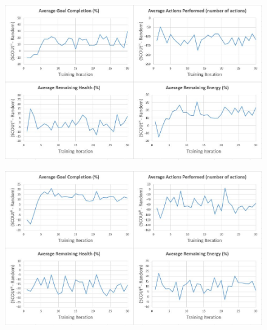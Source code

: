 \begin{appxfig}[H]
\begin{figure}[H]
  \centering
  \includegraphics[width=1.0\columnwidth]{Figures/Results/TrainingVariation2/FindHuman.JPG}
\end{figure}
\caption{Iteration testing performance results for $SCOUt_{FH}$ attempting \textit{Find Human} using setup variation 2 (see subsection~\ref{subsec:training_variations}). All graphs show the controller's average difference in performance compared to $Random$ ($SCOUt_{FH}$ average - $Random$ average) VS the number of training iterations completed.}
\label{appendix:findhuman_training_variation2}
\end{appxfig}


\begin{appxfig}[H]
\begin{figure}[H]
  \centering
  \includegraphics[width=1.0\columnwidth]{Figures/Results/TrainingVariation2/MapWater.JPG}
\end{figure}
\caption{Iteration testing performance results for $SCOUt_{MW}$ attempting \textit{Map Water} using setup variation 2 (see subsection~\ref{subsec:training_variations}). All graphs show the controller's average difference in performance compared to $Random$ ($SCOUt_{MW}$ average - $Random$ average) VS the number of training iterations completed.}
\label{appendix:mapwater_training_variation2}
\end{appxfig}


